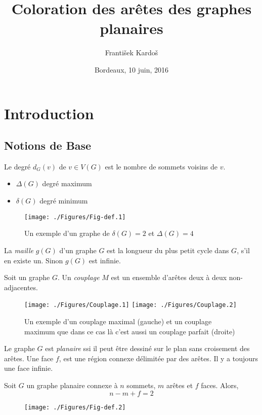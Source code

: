 \documentclass{beamer}
\title[Coloration des arêtes des graphes planaires]{Coloration des arêtes des graphes planaires}
\author[A. Gallastegui and F. Kardo\v s]{\underbar{Antonio Gallastegui} \and Franti\v sek Kardo\v s}
\institute[]{
Laboratoire Bordelais de Recherche Informatique \\
Université de Bordeaux\\
}
\date{Bordeaux, 10 juin, 2016}
\begin{document}
\begin{frame}
  \titlepage
\end{frame}
\section{Introduction}
\subsection{Notions de Base}
\begin{frame}
Le degré $d_G(v)$ de $v\in V(G)$ est le nombre de sommets voisins de $v$.
\begin{itemize}
\item $\Delta(G)$ degré maximum
\item $\delta(G)$ degré minimum
\end{itemize} 
\begin{figure}[ht]
\centerline{
\texttt{[image: ./Figures/Fig-def.1]}
}
\caption{Un exemple d'un graphe de $\delta(G)= 2$ et $\Delta(G)= 4$}
\end{figure}


La \emph{maille} $g(G)$ d'un graphe $G$ est la longueur du plus petit cycle dans $G$, s'il en existe un. Sinon $g(G)$ est infinie.
\end{frame}

\begin{frame}
Soit un graphe $G$. Un \emph{couplage} $M$ est un ensemble d'arêtes deux à deux non-adjacentes.
\begin{figure}[ht]
\centerline{
\texttt{[image: ./Figures/Couplage.1]}
\hfil
\texttt{[image: ./Figures/Couplage.2]}
}
\caption{Un exemple d'un couplage maximal (gauche) et un couplage maximum que dans ce cas là c'est aussi un couplage parfait (droite)}

\end{figure}

\end{frame}

\begin{frame}
Le graphe $G$ est \emph{planaire} ssi il peut être dessiné sur le plan sans croisement des arêtes.
Une face $f$, est une région connexe délimitée par des arêtes. Il y a toujours une face infinie.
\pause
\begin{theorem}[Euler, 1750]
Soit $G$ un graphe planaire connexe à $n$ sommets, $m$ arêtes et $f$ faces. Alors,
$$
n-m+f=2
$$
\end{theorem}
\begin{figure}[ht]
\centerline{
\texttt{[image: ./Figures/Fig-def.2]}
}
\end{figure}
\end{frame}
\end{document}
